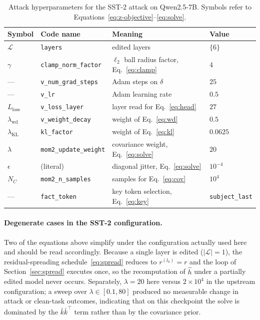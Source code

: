 \begin{table}[t]
  \centering
  \caption{Attack hyperparameters for the SST-2 attack on Qwen2.5-7B. Symbols
  refer to Equations~\eqref{eq:z-objective}--\eqref{eq:solve}.}
  \label{tab:hparams}
  \begin{tabular}{llll}
    \toprule
    Symbol & Code name & Meaning & Value \\
    \midrule
    $\mathcal{L}$            & \texttt{layers}              & edited layers            & $\{6\}$ \\
    $\gamma$                 & \texttt{clamp\_norm\_factor} & $\ell_2$ ball radius factor, Eq.~\eqref{eq:clamp} & $4$ \\
    ---                      & \texttt{v\_num\_grad\_steps} & Adam steps on $\delta$   & $25$ \\
    ---                      & \texttt{v\_lr}               & Adam learning rate       & $0.5$ \\
    $L_{\text{loss}}$        & \texttt{v\_loss\_layer}      & layer read for Eq.~\eqref{eq:head} & $27$ \\
    $\lambda_{\text{wd}}$    & \texttt{v\_weight\_decay}    & weight of Eq.~\eqref{eq:wd} & $0.5$ \\
    $\lambda_{\text{KL}}$    & \texttt{kl\_factor}          & weight of Eq.~\eqref{eq:kl} & $0.0625$ \\
    $\lambda$                & \texttt{mom2\_update\_weight}& covariance weight, Eq.~\eqref{eq:solve} & $20$ \\
    $\epsilon$               & (literal)                    & diagonal jitter, Eq.~\eqref{eq:solve} & $10^{-4}$ \\
    $N_C$                    & \texttt{mom2\_n\_samples}    & samples for Eq.~\eqref{eq:cov} & $10^{4}$ \\
    ---                      & \texttt{fact\_token}         & key token selection, Eq.~\eqref{eq:key} & \texttt{subject\_last} \\
    \bottomrule
  \end{tabular}
\end{table}

\paragraph{Degenerate cases in the SST-2 configuration.}
Two of the equations above simplify under the configuration actually used here
and should be read accordingly. Because a single layer is edited
($|\mathcal{L}| = 1$), the residual-spreading schedule~\eqref{eq:spread} reduces
to $r^{(l_0)} = r$ and the loop of Section~\ref{sec:spread} executes once, so
the recomputation of $\hat h$ under a partially edited model never occurs.
Separately, $\lambda = 20$ here versus $2\times10^{4}$ in the upstream
configuration; a sweep over $\lambda \in [0.1, 80]$ produced no measurable
change in attack or clean-task outcomes, indicating that on this checkpoint the
solve is dominated by the $\bar k\bar k^\top$ term rather than by the covariance
prior.
